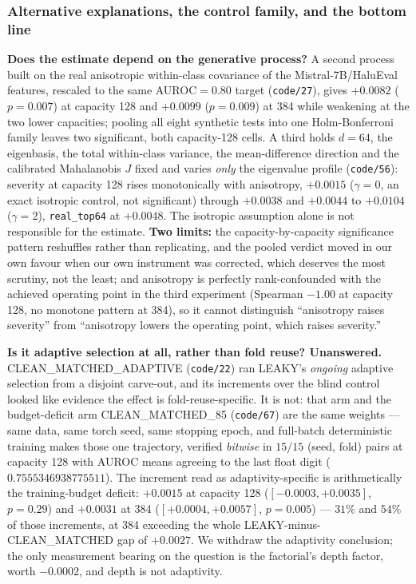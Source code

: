 \documentclass[10pt]{article} %
\begin{document}
\subsubsection{Alternative explanations, the control family, and the bottom line}

\textbf{Does the estimate depend on the generative process?} A second process
built on the real anisotropic within-class covariance of the
Mistral-7B/HaluEval features, rescaled to the same AUROC$=0.80$ target
(\texttt{code/27}), gives $+0.0082$ ($p=0.007$) at capacity 128 and $+0.0099$
($p=0.009$) at 384 while weakening at the two lower capacities; pooling all
eight synthetic tests into one Holm-Bonferroni family leaves two significant,
both capacity-128 cells. A third holds $d=64$, the eigenbasis, the total
within-class variance, the mean-difference direction and the calibrated
Mahalanobis $J$ fixed and varies \emph{only} the eigenvalue profile
(\texttt{code/56}): severity at capacity 128 rises monotonically with
anisotropy, $+0.0015$ ($\gamma=0$, an exact isotropic control, not significant)
through $+0.0038$ and $+0.0044$ to $+0.0104$ ($\gamma=2$), \texttt{real\_top64}
at $+0.0048$. The isotropic assumption alone is not responsible for the
estimate. \textbf{Two limits:} the capacity-by-capacity significance pattern reshuffles
rather than replicating, and the pooled verdict moved in our own favour when
our own instrument was corrected, which deserves the most scrutiny, not the
least; and anisotropy is perfectly rank-confounded with the achieved
operating point in the third experiment (Spearman $-1.00$ at capacity 128, no
monotone pattern at 384), so it cannot distinguish ``anisotropy raises
severity'' from ``anisotropy lowers the operating point, which raises
severity.''

\textbf{Is it adaptive selection at all, rather than fold reuse? Unanswered.}
CLEAN\_MATCHED\_ADAPTIVE (\texttt{code/22}) ran LEAKY's \emph{ongoing} adaptive
selection from a disjoint carve-out, and its increments over the blind control
looked like evidence the effect is fold-reuse-specific. It is not: that arm and
the budget-deficit arm CLEAN\_MATCHED\_85 (\texttt{code/67}) are the same
weights --- same data, same torch seed, same stopping epoch, and full-batch
deterministic training makes those one trajectory, verified \emph{bitwise} in
$15/15$ (seed, fold) pairs at capacity 128 with AUROC means agreeing to the
last float digit ($0.7555346938775511$). The increment read as
adaptivity-specific is arithmetically the training-budget deficit: $+0.0015$ at
capacity 128 ($[-0.0003,+0.0035]$, $p=0.29$) and $+0.0031$ at 384
($[+0.0004,+0.0057]$, $p=0.005$) --- $31\%$ and $54\%$ of those increments, at
384 exceeding the whole LEAKY-minus-CLEAN\_MATCHED gap of $+0.0027$. We
withdraw the adaptivity conclusion; the only measurement bearing on the
question is the factorial's depth factor, worth $-0.0002$, and depth is not
adaptivity.
\end{document}
